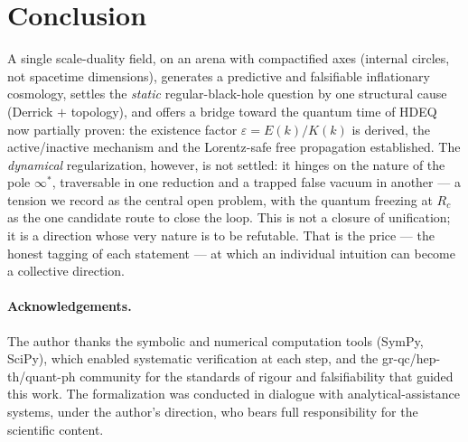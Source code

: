 \documentclass[11pt,a4paper]{article}
\theoremstyle{definition}
\begin{document}
\section{Conclusion}
A single scale-duality field, on an arena with compactified axes (internal circles, not
spacetime dimensions), generates a predictive and falsifiable inflationary cosmology, settles
the \emph{static} regular-black-hole question by one structural cause (Derrick $+$ topology),
and offers a bridge toward the quantum time of HDEQ now partially proven: the existence factor
$\varepsilon=E(k)/K(k)$ is derived, the active/inactive mechanism and the Lorentz-safe free
propagation established. The \emph{dynamical} regularization, however, is not settled: it
hinges on the nature of the pole $\infty^*$, traversable in one reduction and a trapped false
vacuum in another --- a tension we record as the central open problem, with the quantum
freezing at $R_c$ as the one candidate route to close the loop. This is not a closure of
unification; it is a direction whose very nature is to be refutable. That is the price --- the
honest tagging of each statement --- at which an individual intuition can become a collective
direction.

\paragraph{Acknowledgements.} The author thanks the symbolic and numerical computation tools
(SymPy, SciPy), which enabled systematic verification at each step, and the
gr-qc/hep-th/quant-ph community for the standards of rigour and falsifiability that guided this
work. The formalization was conducted in dialogue with analytical-assistance systems, under
the author's direction, who bears full responsibility for the scientific content.

\end{document}
